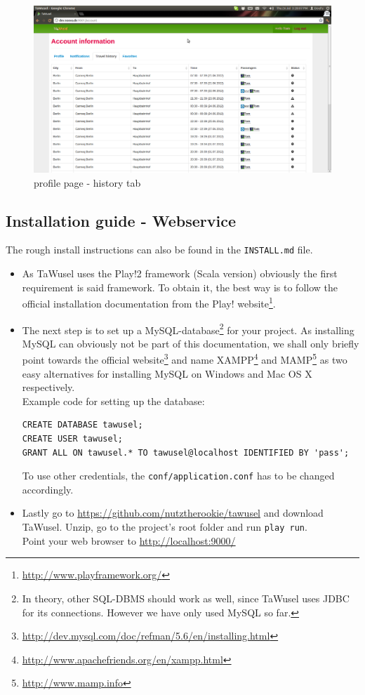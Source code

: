 \begin{figure}[h]
	\includegraphics[width=16cm]{images/TaWusel_Web_history.png}
	\caption{profile page - history tab}
	\label{img:WebLogin}
\end{figure}
\subsection{Installation guide - Webservice}\label{ssec:WebInst}

The rough install instructions can also be found in the \texttt{INSTALL.md} file.
\begin{itemize}

\item As TaWusel uses the Play!2 framework (Scala version) obviously the first requirement is said framework. To obtain it, the
best way is to follow the official installation documentation from the Play!
website\footnote{\url{http://www.playframework.org/}}.

\item The next step is to set up a MySQL-database\footnote{In theory, other SQL-DBMS should work as well, since TaWusel uses
JDBC for its connections. However we have only used MySQL so far.} for your project.
As installing MySQL can obviously not be part of this documentation, we shall only briefly point towards the official
website\footnote{\url{http://dev.mysql.com/doc/refman/5.6/en/installing.html}} and name
XAMPP\footnote{\url{http://www.apachefriends.org/en/xampp.html}} and MAMP\footnote{\url{http://www.mamp.info}} as two easy
alternatives
for installing MySQL on Windows and Mac OS X respectively.\\
Example code for setting up the database:
\begin{verbatim}
CREATE DATABASE tawusel;
CREATE USER tawusel;
GRANT ALL ON tawusel.* TO tawusel@localhost IDENTIFIED BY 'pass';
\end{verbatim}
\small{To use other credentials, the \texttt{conf/application.conf} has to be changed accordingly.}

\item Lastly go to \url{https://github.com/nutztherookie/tawusel} and download TaWusel. Unzip, go to the project's root folder and
run \texttt{play run}.\\
Point your web browser to \url{http://localhost:9000/}


\end{itemize}